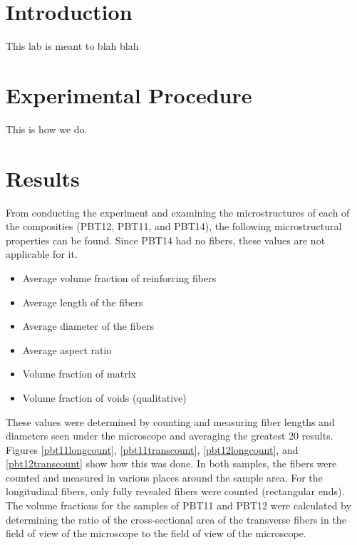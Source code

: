 \documentclass[11pt]{article}
\begin{document}
\tableofcontents
\newpage
\listoffigures
\newpage
\listoftables
\newpage

\section{Introduction}
This lab is meant to blah blah

\section{Experimental Procedure}
This is how we do.

\section{Results}
From conducting the experiment and examining the microstructures of each of the composities (PBT12, PBT11, and PBT14), the following microstructural properties can be found. Since PBT14 had no fibers, these values are not applicable for it.

\begin{itemize}
\item Average volume fraction of reinforcing fibers
\item Average length of the fibers
\item Average diameter of the fibers
\item Average aspect ratio
\item Volume fraction of matrix
\item Volume fraction of voids (qualitative)
\end{itemize}

These values were determined by counting and measuring fiber lengths and diameters seen under the microscope and averaging the greatest 20 results. Figures \ref{pbt11longcount}, \ref{pbt11transcount}, \ref{pbt12longcount}, and \ref{pbt12transcount} show how this was done. In both samples, the fibers were counted and measured in various places around the sample area. For the longitudinal fibers, only fully revealed fibers were counted (rectangular ends). The volume fractions for the samples of PBT11 and PBT12 were calculated by determining the ratio of the cross-sectional area of the transverse fibers in the field of view of the microscope to the field of view of the microscope.
\end{document}
